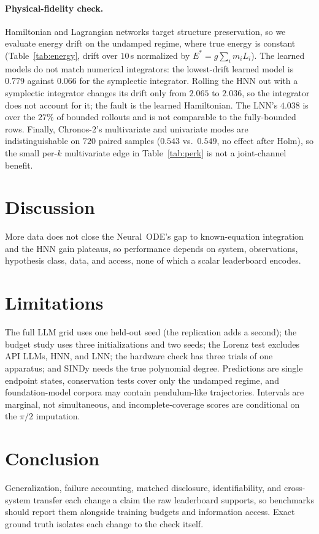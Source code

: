 \documentclass{article}
\begin{document}
\paragraph{Physical-fidelity check.}
\label{sec:energy}
Hamiltonian and Lagrangian networks target structure preservation, so we evaluate energy
drift on the undamped regime, where true energy is constant (Table~\ref{tab:energy}, drift over
$10$\,s normalized by $E^{*}{=}g\sum_i m_i L_i$). The learned models do not match numerical
integrators: the lowest-drift learned model is $0.779$ against $0.066$ for the symplectic
integrator. Rolling the HNN out with a symplectic integrator changes its drift only from
$2.065$ to $2.036$, so the integrator does not account for it; the fault is the learned
Hamiltonian. The LNN's $4.038$ is over the $27\%$ of bounded rollouts and is not comparable to
the fully-bounded rows. Finally, Chronos-2's multivariate and univariate modes are
indistinguishable on $720$ paired samples ($0.543$ vs.\ $0.549$, no effect after Holm), so the
small per-$k$ multivariate edge in Table~\ref{tab:perk} is not a joint-channel benefit.

\section{Discussion}
More data does not close the Neural~ODE's gap to known-equation integration and the HNN gain
plateaus, so performance depends on system, observations, hypothesis class, data, and access,
none of which a scalar leaderboard encodes.

\section{Limitations}
\label{sec:limitations}
The full LLM grid uses one held-out seed (the replication adds a second); the budget study uses
three initializations and two seeds; the Lorenz test excludes API LLMs, HNN, and LNN; the
hardware check has three trials of one apparatus; and SINDy needs the true polynomial degree.
Predictions are single endpoint states, conservation tests cover only the undamped regime, and
foundation-model corpora may contain pendulum-like trajectories. Intervals are marginal, not
simultaneous, and incomplete-coverage scores are conditional on the $\pi/2$ imputation.

\section{Conclusion}
Generalization, failure accounting, matched disclosure, identifiability, and cross-system
transfer each change a claim the raw leaderboard supports, so benchmarks should report them
alongside training budgets and information access. Exact ground truth isolates each change to
the check itself.
\end{document}
